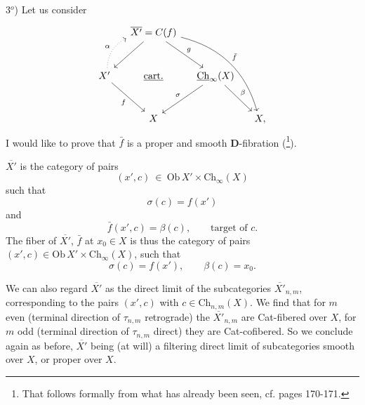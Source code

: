 \documentclass[11pt]{article}
\newcommand{\printedpage}[1]{\marginpar{\footnotesize p.~#1}}
\newcommand{\msp}[1]{\marginpar{\footnotesize [#1]}}
\newcommand{\Ch}{\underline{\mathrm{Ch}}}
\newcommand{\Xb}{\overline{X'}}
\begin{document}
3$^o$) Let us consider
\[
\begin{tikzcd}[column sep=small, row sep=large]
 & \Xb = C(f) \arrow[dl] \arrow[dr, "g"] \arrow[ddrr, bend left, "\bar f"] & & \\
X' \arrow[ur, dotted, bend left, "\alpha"] \arrow[dr, "f"'] & \underline{\text{cart.}} & \Ch_\infty(X) \arrow[dl, "\sigma"'] \arrow[dr, "\beta"] & \\
 & X & & X,
\end{tikzcd}
\]
\msp{page 153}
I would like to prove that $\bar f$ is a proper and smooth \textbf{D}-fibration (\footnote[38]{That follows formally from what has already been seen, cf. pages 170-171.}).

$\Xb$ is the category of pairs
\[
(x',c) \ \in \ \mathrm{Ob}\,X' \times \mathrm{Ch}_\infty(X)
\]
such that
\[
\sigma(c) = f(x')
\]
and
\[
\bar f(x',c) = \beta(c), \qquad \text{target of } c.
\]
The fiber of $\Xb$, $\bar f$ at $x_0 \in X$ is thus the category of pairs $(x',c) \in \mathrm{Ob}\,X' \times \mathrm{Ch}_\infty(X)$, such that
\[
\sigma(c) = f(x'), \qquad \beta(c) = x_0.
\]

\printedpage{96}
We can also regard $\Xb$ as the direct limit of the subcategories $\Xb_{n,m}$, corresponding to the pairs $(x',c)$ with $c \in \mathrm{Ch}_{n,m}(X)$. We find that for $m$ even (terminal direction of $\tau_{n,m}$ retrograde) the $\Xb_{n,m}$ are Cat-fibered over $X$, for $m$ odd (terminal direction of $\tau_{n,m}$ direct) they are Cat-cofibered. So we conclude again as before, $\Xb$ being (at will) a filtering direct limit of subcategories smooth over $X$, or proper over $X$. %
\end{document}
